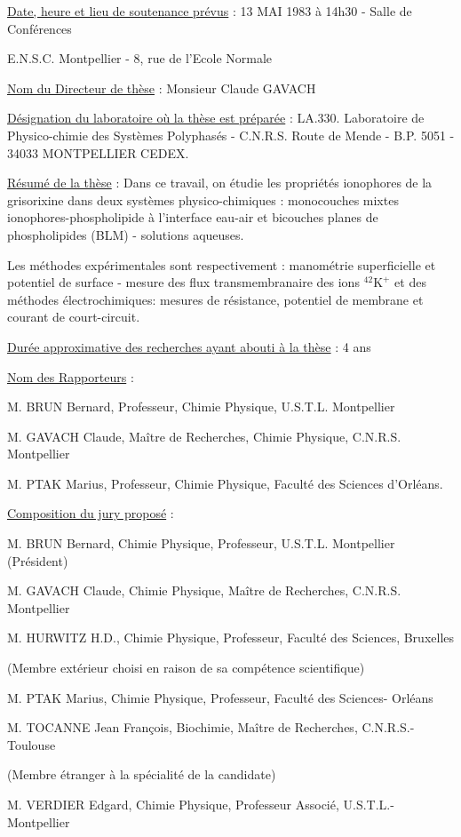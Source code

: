 \uline{Date, heure et lieu de soutenance prévus} : 13 MAI 1983 à 14h30 - Salle de Conférences

E.N.S.C. Montpellier - 8, rue de l'Ecole Normale

\uline{Nom du Directeur de thèse} : Monsieur Claude GAVACH

\uline{Désignation du laboratoire où la thèse est préparée} : LA.330. Laboratoire de Physico-chimie des Systèmes Polyphasés - C.N.R.S. Route de Mende - B.P. 5051 - 34033 MONTPELLIER CEDEX.

\uline{Résumé de la thèse} : Dans ce travail, on étudie les propriétés ionophores de la grisorixine dans deux systèmes physico-chimiques : monocouches mixtes ionophores-phospholipide à l'interface eau-air et bicouches planes de phospholipides (BLM) - solutions aqueuses.

Les méthodes expérimentales sont respectivement : manométrie superficielle et potentiel de surface - mesure des flux transmembranaire des ions ${}^{42}\mathrm{K}^{+}$ et des méthodes électrochimiques: mesures de résistance, potentiel de membrane et courant de court-circuit.

\uline{Durée approximative des recherches ayant abouti à la thèse} : 4 ans

\uline{Nom des Rapporteurs} :

M. BRUN Bernard, Professeur, Chimie Physique, U.S.T.L. Montpellier

M. GAVACH Claude, Maître de Recherches, Chimie Physique, C.N.R.S. Montpellier

M. PTAK Marius, Professeur, Chimie Physique, Faculté des Sciences d'Orléans.

\uline{Composition du jury proposé} :

M. BRUN Bernard, Chimie Physique, Professeur, U.S.T.L. Montpellier (Président)

M. GAVACH Claude, Chimie Physique, Maître de Recherches, C.N.R.S. Montpellier

M. HURWITZ H.D., Chimie Physique, Professeur, Faculté des Sciences, Bruxelles

(Membre extérieur choisi en raison de sa compétence scientifique)

M. PTAK Marius, Chimie Physique, Professeur, Faculté des Sciences- Orléans

M. TOCANNE Jean François, Biochimie, Maître de Recherches, C.N.R.S.- Toulouse

(Membre étranger à la spécialité de la candidate)

M. VERDIER Edgard, Chimie Physique, Professeur Associé, U.S.T.L.- Montpellier

